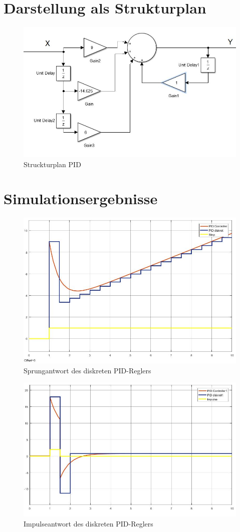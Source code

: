 \documentclass[12pt,a4paper]{report}
\begin{document}
\section{Darstellung als Strukturplan}

\begin{figure}[h]
	\centering
	\includegraphics[width=0.8\linewidth]{marius/PID}
	\caption{Struckturplan PID}
	\label{fig:PID}
\end{figure}

\section{Simulationsergebnisse}
\begin{figure}[ht]
	\centering
	\includegraphics[width=0.9\linewidth]{marius/PID_Step}
	\caption{Sprungantwort des diskreten PID-Reglers}
	\label{fig:PID_Step}
\end{figure}
\begin{figure}[ht]
	\centering
	\includegraphics[width=0.9\linewidth]{marius/PID_Impulse}
	\caption{Impulseantwort des diskreten PID-Reglers}
	\label{fig:PID_Impulse}
\end{figure}
\end{document}
